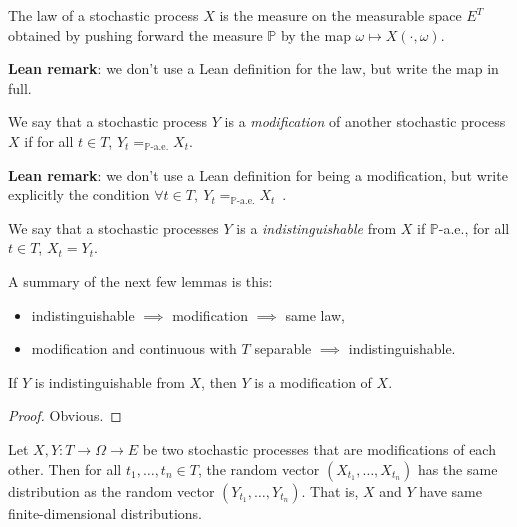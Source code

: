 \begin{definition}\label{def:processLaw}
  \leanok
The law of a stochastic process $X$ is the measure on the measurable space $E^T$ obtained by pushing forward the measure $\mathbb{P}$ by the map $\omega \mapsto X(\cdot, \omega)$.
\end{definition}

\textbf{Lean remark}: we don't use a Lean definition for the law, but write the map in full.

\begin{definition}[Modification]\label{def:modification}
  \leanok
We say that a stochastic process $Y$ is a \emph{modification} of another stochastic process $X$ if for all $t \in T$, $Y_t =_{\mathbb{P}\text{-a.e.}} X_t$.
\end{definition}

\textbf{Lean remark}: we don't use a Lean definition for being a modification, but write explicitly the condition $\forall t \in T,\ Y_t =_{\mathbb{P}\text{-a.e.}} X_t$~.

\begin{definition}[Indistinguishable]\label{def:indistinguishable}
  \leanok
We say that a stochastic processes $Y$ is a \emph{indistinguishable} from $X$ if $\mathbb{P}$-a.e., for all $t \in T$, $X_t = Y_t$.
\end{definition}

A summary of the next few lemmas is this:
\begin{itemize}
  \item indistinguishable $\implies$ modification $\implies$ same law,
  \item modification and continuous with $T$ separable $\implies$ indistinguishable.
\end{itemize}


\begin{lemma}\label{lem:Indistinguishable.Modification}
  \leanok
If $Y$ is indistinguishable from $X$, then $Y$ is a modification of $X$.
\end{lemma}

\begin{proof}\leanok
Obvious.
\end{proof}


\begin{lemma}\label{lem:map_eq_of_modification}
  \mathlibok
Let $X, Y : T \to \Omega \to E$ be two stochastic processes that are modifications of each other.
Then for all $t_1, \ldots, t_n \in T$, the random vector $(X_{t_1}, \ldots, X_{t_n})$ has the same distribution as the random vector $(Y_{t_1}, \ldots, Y_{t_n})$.
That is, $X$ and $Y$ have same finite-dimensional distributions.
\end{lemma}


